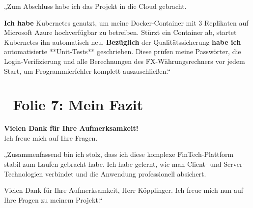 \documentclass[11pt,a4paper]{article}
\begin{document}
\begin{tcolorbox}[colback=white, colframe=primarynavy, title=\textbf{Mein Sprechtext (Ich-Form)}]
„Zum Abschluss habe ich das Projekt in die Cloud gebracht. 

\textbf{Ich habe} Kubernetes genutzt, um meine Docker-Container mit 3 Replikaten auf Microsoft Azure hochverfügbar zu betreiben. Stürzt ein Container ab, startet Kubernetes ihn automatisch neu.
\textbf{Bezüglich} der Qualitätssicherung \textbf{habe ich} automatisierte **Unit-Tests** geschrieben. Diese prüfen meine Passwörter, die Login-Verifizierung und alle Berechnungen des FX-Währungsrechners vor jedem Start, um Programmierfehler komplett auszuschließen.“
\end{tcolorbox}

\newpage

\section{🏁 Folie 7: Mein Fazit}

\begin{tcolorbox}[colback=bglight, colframe=primarynavy, title=\textbf{\color{white}Visualisierung auf Folie 7}, arc=4pt, coltext=white]
\centering
\textbf{Vielen Dank für Ihre Aufmerksamkeit!} \\
Ich freue mich auf Ihre Fragen.
\end{tcolorbox}

\begin{tcolorbox}[colback=white, colframe=primarynavy, title=\textbf{Mein Sprechtext (Ich-Form)}]
„Zusammenfassend bin ich stolz, dass ich diese komplexe FinTech-Plattform stabil zum Laufen gebracht habe. Ich habe gelernt, wie man Client- und Server-Technologien verbindet und die Anwendung professionell absichert.

Vielen Dank für Ihre Aufmerksamkeit, Herr Köpplinger. Ich freue mich nun auf Ihre Fragen zu meinem Projekt.“
\end{tcolorbox}
\end{document}
